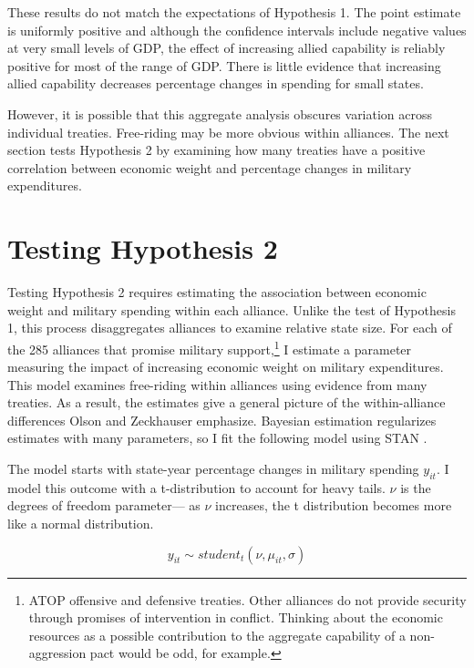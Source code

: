 \documentclass[12pt]{article}
\begin{document}
These results do not match the expectations of Hypothesis 1. 
The point estimate is uniformly positive and although the confidence intervals include negative values at very small levels of GDP, the effect of increasing allied capability is reliably positive for most of the range of GDP. 
There is little evidence that increasing allied capability decreases percentage changes in spending for small states. 


However, it is possible that this aggregate analysis obscures variation across individual treaties. 
Free-riding may be more obvious within alliances. 
The next section tests Hypothesis 2 by examining how many treaties have a positive correlation between economic weight and percentage changes in military expenditures. 


\section{Testing Hypothesis 2}


Testing Hypothesis 2 requires estimating the association between economic weight and military spending within each alliance.
Unlike the test of Hypothesis 1, this process disaggregates alliances to examine relative state size. 
For each of the 285 alliances that promise military support,\footnote{ATOP offensive and defensive treaties. Other alliances do not provide security through promises of intervention in conflict. Thinking about the economic resources as a possible contribution to the aggregate capability of a non-aggression pact would be odd, for example.} I estimate a parameter measuring the impact of increasing economic weight on military expenditures. 
This model examines free-riding within alliances using evidence from many treaties. 
As a result, the estimates give a general picture of the within-alliance differences Olson and Zeckhauser emphasize.  
Bayesian estimation regularizes estimates with many parameters, so I fit the following model using STAN \citep{Carpenteretal2016}.


The model starts with state-year percentage changes in military spending $y_{it}$.
I model this outcome with a t-distribution to account for heavy tails.
$\nu$ is the degrees of freedom parameter--- as $\nu$ increases, the t distribution becomes more like a normal distribution. 


\begin{equation}
y_{it} \sim student_t(\nu, \mu_{it}, \sigma) 
\end{equation}
\end{document}
